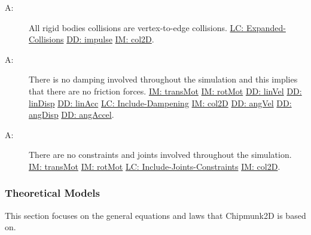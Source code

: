 \documentclass[12pt]{article}
\newcounter{assumpnum}
\newcommand{\atheassumpnum}{A\theassumpnum}
\begin{document}
\begin{description}
\item[\atheassumpnum\label{A:collisionType}:]All rigid bodies collisions are vertex-to-edge collisions. \hyperref[lcEC]{LC: Expanded-Collisions} \hyperref[DD:impulse]{DD: impulse} \hyperref[IM:col2D]{IM: col2D}.
\end{description}
\begin{description}
\item[\atheassumpnum\label{A:dampingInvolvement}:]There is no damping involved throughout the simulation and this implies that there are no friction forces. \hyperref[IM:transMot]{IM: transMot} \hyperref[IM:rotMot]{IM: rotMot} \hyperref[DD:linVel]{DD: linVel} \hyperref[DD:linDisp]{DD: linDisp} \hyperref[DD:linAcc]{DD: linAcc} \hyperref[lcID]{LC: Include-Dampening} \hyperref[IM:col2D]{IM: col2D} \hyperref[DD:angVel]{DD: angVel} \hyperref[DD:angDisp]{DD: angDisp} \hyperref[DD:angAccel]{DD: angAccel}.
\end{description}
\begin{description}
\item[\atheassumpnum\label{A:constraintsAndJointsInvolvement}:]There are no constraints and joints involved throughout the simulation. \hyperref[IM:transMot]{IM: transMot} \hyperref[IM:rotMot]{IM: rotMot} \hyperref[lcIJC]{LC: Include-Joints-Constraints} \hyperref[IM:col2D]{IM: col2D}.
\end{description}
\subsubsection{Theoretical Models}
\label{Sec:TMs}
This section focuses on the general equations and laws that Chipmunk2D is based on.
\par~
\end{document}
